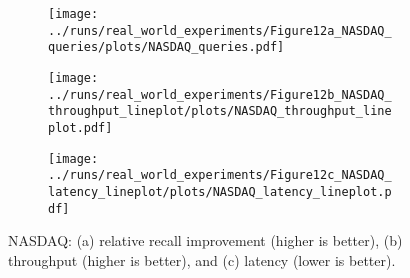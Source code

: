 \begin{figure*}[t]
	\centering
	\begin{subfigure}{.32\linewidth}
		\centering
		\texttt{[image: ../runs/real\_world\_experiments/Figure12a\_NASDAQ\_queries/plots/NASDAQ\_queries.pdf]}
		\vspace{-15pt}
		\caption{}
		\label{plot:nasdaq_average_total_match_ratio}
	\end{subfigure}
	\begin{subfigure}{.32\linewidth}
		\centering
		\texttt{[image: ../runs/real\_world\_experiments/Figure12b\_NASDAQ\_throughput\_lineplot/plots/NASDAQ\_throughput\_lineplot.pdf]}
		\vspace{-15pt}
		\caption{}
		\label{plot:nasdaq_throughput}
	\end{subfigure}
	\begin{subfigure}{.32\linewidth}
		\centering
		\texttt{[image: ../runs/real\_world\_experiments/Figure12c\_NASDAQ\_latency\_lineplot/plots/NASDAQ\_latency\_lineplot.pdf]}
		\vspace{-15pt}
		\caption{}
		\label{plot:nasdaq_latency}
	\end{subfigure}
    \vspace{-1em}
	\caption{NASDAQ: (a) relative recall improvement (higher is better), (b) throughput (higher is better), and (c) latency (lower is better).}
	\label{fig:nasdaq}
	\vspace{-1em}
\end{figure*}
